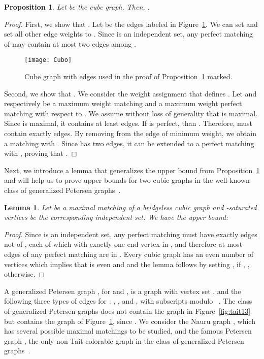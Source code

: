 \documentclass{article}
\newtheorem{lem}[thm]{Lemma}
\newtheorem{proposition}[thm]{Proposition}
\begin{document}
\begin{proposition} \label{prop:cube}
Let  be the cube graph. Then, .
\end{proposition}
\begin{proof}
First, we show that . Let  be the edges labeled in Figure~\ref{fig:cube}. We can set  and set all other edge weights to . 
Since  is an independent set, any perfect matching of  may contain at most two edges among .

\begin{figure}[ht]
\centering
\texttt{[image: Cubo]}
\caption{Cube graph  with edges used in the proof of Proposition~\ref{prop:cube} marked.
}
\label{fig:cube}
\end{figure}

Second, we show that . We consider the weight assignment  that defines . Let  and  respectively be a maximum weight matching and a maximum weight perfect matching with respect to . We assume without loss of generality that  is maximal. Since  is maximal, it contains at least  edges. If  is perfect, than . Therefore,  must contain exactly  edges. By removing from  the edge of minimum weight, we obtain a matching  with . Since  has two edges, it can be extended to a perfect matching  with , proving that .
\end{proof}

Next, we introduce a lemma that generalizes the upper bound from Proposition~\ref{prop:cube} and will help us to prove upper bounds for two cubic graphs in the well-known class of generalized Petersen graphs~\cite{Watkins_gen}.

\begin{lem}\label{maxmatchings}
Let  be a maximal matching of a bridgeless cubic graph  and -saturated vertices be the corresponding independent set. We have the upper bound:


\end{lem}
\begin{proof}
Since  is an independent set, any perfect matching must have exactly  edges not of , each of which with exactly one end vertex in , and therefore at most  edges of any perfect matching are in . Every cubic graph has an even number of vertices which implies that  is even and  and the lemma follows by setting , if , , otherwise.
\end{proof}

A generalized Petersen graph , for  and , is a graph with vertex set , and the following three types of edges for : , , and , with subscripts modulo ~\cite{Watkins_gen}. The class of generalized Petersen graphs does not contain the graph in Figure~\ref{fig:tait13} but contains the graph of Figure~\ref{fig:cube}, since . We consider the Nauru graph , which has several possible maximal matchings to be studied, and the famous Petersen graph , the only non Tait-colorable graph in the class of generalized Petersen graphs~\cite{Castagna1972}.
\end{document}
